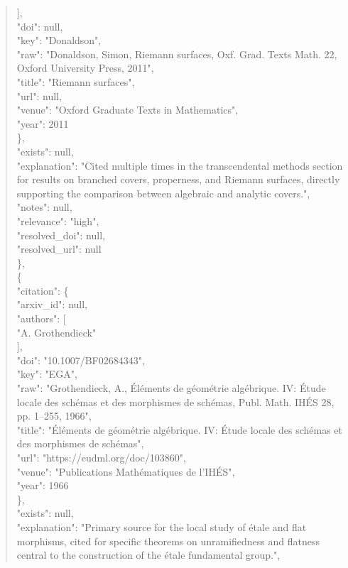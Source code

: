 \documentclass[11pt]{article}
\begin{document}
\begin{quote}
        ],\\
        "doi": null,\\
        "key": "Donaldson",\\
        "raw": "Donaldson, Simon, Riemann surfaces, Oxf. Grad. Texts Math. 22, Oxford University Press, 2011",\\
        "title": "Riemann surfaces",\\
        "url": null,\\
        "venue": "Oxford Graduate Texts in Mathematics",\\
        "year": 2011\\
      \},\\
      "exists": null,\\
      "explanation": "Cited multiple times in the transcendental methods section for results on branched covers, properness, and Riemann surfaces, directly supporting the comparison between algebraic and analytic covers.",\\
      "notes": null,\\
      "relevance": "high",\\
      "resolved\_doi": null,\\
      "resolved\_url": null\\
    \},\\
    \{\\
      "citation": \{\\
        "arxiv\_id": null,\\
        "authors": [\\
          "A. Grothendieck"\\
        ],\\
        "doi": "10.1007/BF02684343",\\
        "key": "EGA",\\
        "raw": "Grothendieck, A., Éléments de géométrie algébrique. IV: Étude locale des schémas et des morphismes de schémas, Publ. Math. IHÉS 28, pp. 1--255, 1966",\\
        "title": "Éléments de géométrie algébrique. IV: Étude locale des schémas et des morphismes de schémas",\\
        "url": "https://eudml.org/doc/103860",\\
        "venue": "Publications Mathématiques de l'IHÉS",\\
        "year": 1966\\
      \},\\
      "exists": null,\\
      "explanation": "Primary source for the local study of étale and flat morphisms, cited for specific theorems on unramifiedness and flatness central to the construction of the étale fundamental group.",\\

\end{quote}
\end{document}
